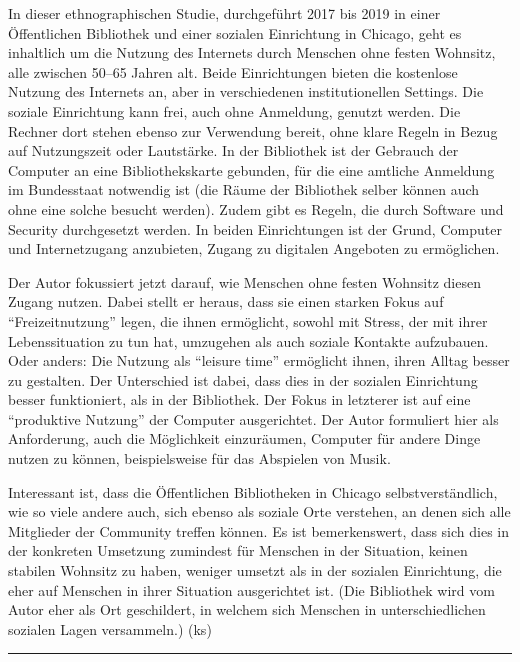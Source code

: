 \documentclass[a4paper,
fontsize=11pt,
oneside,
numbers=noperiodatend,
parskip=half-,
bibliography=totoc,
final
]{scrartcl}
\begin{document}
In dieser ethnographischen Studie, durchgeführt 2017 bis 2019 in einer
Öffentlichen Bibliothek und einer sozialen Einrichtung in Chicago, geht
es inhaltlich um die Nutzung des Internets durch Menschen ohne festen
Wohnsitz, alle zwischen 50--65 Jahren alt. Beide Einrichtungen bieten
die kostenlose Nutzung des Internets an, aber in verschiedenen
institutionellen Settings. Die soziale Einrichtung kann frei, auch ohne
Anmeldung, genutzt werden. Die Rechner dort stehen ebenso zur Verwendung
bereit, ohne klare Regeln in Bezug auf Nutzungszeit oder Lautstärke. In
der Bibliothek ist der Gebrauch der Computer an eine Bibliothekskarte
gebunden, für die eine amtliche Anmeldung im Bundesstaat notwendig ist
(die Räume der Bibliothek selber können auch ohne eine solche besucht
werden). Zudem gibt es Regeln, die durch Software und Security
durchgesetzt werden. In beiden Einrichtungen ist der Grund, Computer und
Internetzugang anzubieten, Zugang zu digitalen Angeboten zu ermöglichen.

Der Autor fokussiert jetzt darauf, wie Menschen ohne festen Wohnsitz
diesen Zugang nutzen. Dabei stellt er heraus, dass sie einen starken
Fokus auf \enquote{Freizeitnutzung} legen, die ihnen ermöglicht, sowohl
mit Stress, der mit ihrer Lebenssituation zu tun hat, umzugehen als auch
soziale Kontakte aufzubauen. Oder anders: Die Nutzung als
\enquote{leisure time} ermöglicht ihnen, ihren Alltag besser zu
gestalten. Der Unterschied ist dabei, dass dies in der sozialen
Einrichtung besser funktioniert, als in der Bibliothek. Der Fokus in
letzterer ist auf eine \enquote{produktive Nutzung} der Computer
ausgerichtet. Der Autor formuliert hier als Anforderung, auch die
Möglichkeit einzuräumen, Computer für andere Dinge nutzen zu können,
beispielsweise für das Abspielen von Musik.

Interessant ist, dass die Öffentlichen Bibliotheken in Chicago
selbstverständlich, wie so viele andere auch, sich ebenso als soziale
Orte verstehen, an denen sich alle Mitglieder der Community treffen
können. Es ist bemerkenswert, dass sich dies in der konkreten Umsetzung
zumindest für Menschen in der Situation, keinen stabilen Wohnsitz zu
haben, weniger umsetzt als in der sozialen Einrichtung, die eher auf
Menschen in ihrer Situation ausgerichtet ist. (Die Bibliothek wird vom
Autor eher als Ort geschildert, in welchem sich Menschen in
unterschiedlichen sozialen Lagen versammeln.) (ks)

\begin{center}\rule{0.5\linewidth}{0.5pt}\end{center}
\end{document}
